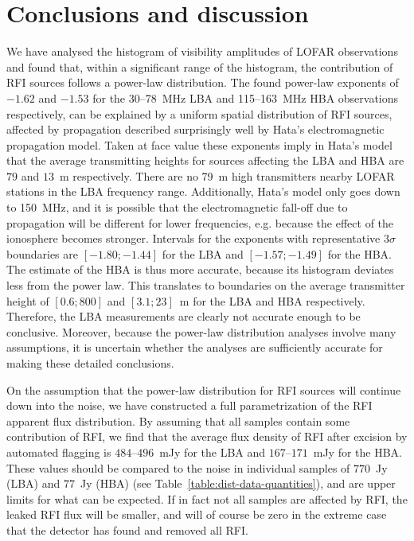 \documentclass[useAMS,usenatbib]{mn2e}
\begin{document}
\section{Conclusions and discussion} \label{sec:dist-discussion}
We have analysed the histogram of visibility amplitudes of LOFAR observations and found that, within a significant range of the histogram, the contribution of RFI sources follows a power-law distribution. The found power-law exponents of $-1.62$ and $-1.53$ for the 30--78~MHz LBA and 115--163~MHz HBA observations respectively, can be explained by a uniform spatial distribution of RFI sources, affected by propagation described surprisingly well by Hata's electromagnetic propagation model. Taken at face value these exponents imply in Hata's model that the average transmitting heights for sources affecting the LBA and HBA are $79$ and $13$~m respectively. There are no 79~m high transmitters nearby LOFAR stations in the LBA frequency range. Additionally, Hata's model only goes down to 150~MHz, and it is possible that the electromagnetic fall-off due to propagation will be different for lower frequencies, e.g. because the effect of the ionosphere becomes stronger. Intervals for the exponents with representative $3\sigma$ boundaries are $[-1.80;-1.44]$ for the LBA and $[-1.57;-1.49]$ for the HBA. The estimate of the HBA is thus more accurate, because its histogram deviates less from the power law. This translates to boundaries on the average transmitter height of $[0.6; 800]$ and $[3.1; 23]$~m for the LBA and HBA respectively. Therefore, the LBA measurements are clearly not accurate enough to be conclusive. Moreover, because the power-law distribution analyses involve many assumptions, it is uncertain whether the analyses are sufficiently accurate for making these detailed conclusions. 

On the assumption that the power-law distribution for RFI sources will continue down into the noise, we have constructed a full parametrization of the RFI apparent flux distribution. By assuming that all samples contain some contribution of RFI, we find that the average flux density of RFI after excision by automated flagging is $484$--$496$~mJy for the LBA and $167$--$171$~mJy for the HBA. These values should be compared to the noise in individual samples of $770$~Jy (LBA) and $77$~Jy (HBA) (see Table~\ref{table:dist-data-quantities}), and are upper limits for what can be expected. If in fact not all samples are affected by RFI, the leaked RFI flux will be smaller, and will of course be zero in the extreme case that the detector has found and removed all RFI.
\end{document}
